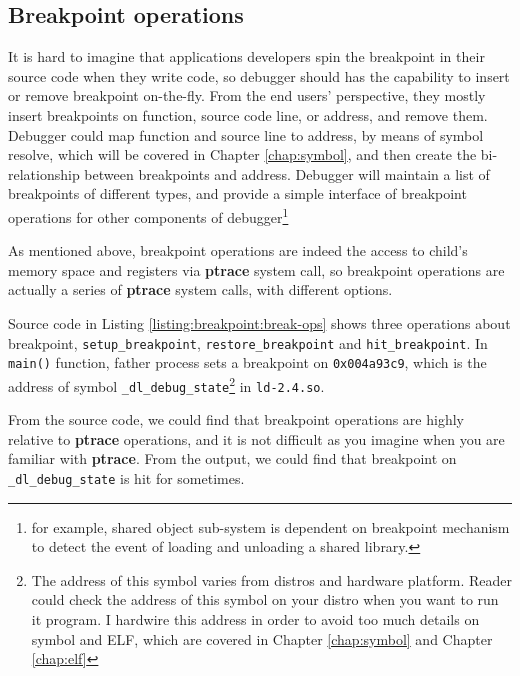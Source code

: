 \documentclass[12pt]{book}
\begin{document}
\begin{CJK}{UTF8}{gbsn}
\section{Breakpoint operations}
It is hard to imagine that applications developers spin the breakpoint in their source code 
when they write code, so debugger should has the capability to insert or remove breakpoint on-the-fly.
From the end users' perspective, they mostly insert breakpoints on function, source code line, 
or address, and remove them.  Debugger could map function and source line to address, by means of symbol
resolve, which will be covered in Chapter \ref{chap:symbol}, and then create the bi-relationship between breakpoints and address.
Debugger will maintain a list of breakpoints of different types, and provide a simple interface of 
breakpoint operations for other components of debugger\footnote{for example, shared object sub-system is dependent on breakpoint mechanism to detect the event of loading and unloading a shared library.}

As mentioned above, breakpoint operations are indeed the access to child's memory space and registers via \textbf{ptrace} system call, so breakpoint operations are actually a series of \textbf{ptrace} system calls, with different options.

Source code in Listing \ref{listing:breakpoint:break-ops} shows three operations about breakpoint, \texttt{setup\_breakpoint}, \texttt{restore\_breakpoint} and
\texttt{hit\_breakpoint}.  In \texttt{main()} function, father process sets a breakpoint on \texttt{0x004a93c9}, which is the address of symbol 
\texttt{\_dl\_debug\_state}\footnote{The address of this symbol varies from distros and hardware platform.  Reader could check the address of this symbol on your
distro when you want to run it program.  I hardwire this address in order to avoid too much details on symbol and ELF, which are covered in Chapter \ref{chap:symbol} 
and Chapter \ref{chap:elf}} in \texttt{ld-2.4.so}.



From the source code, we could find that breakpoint operations are highly relative to \textbf{ptrace} operations, and it is not difficult as you imagine when you are familiar with \textbf{ptrace}.  From the output, we could find that breakpoint on \texttt{\_dl\_debug\_state} is hit for sometimes.



\end{CJK}
\end{document}
